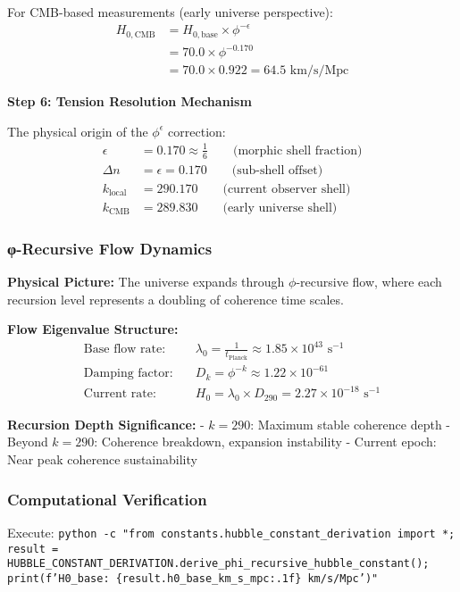 For CMB-based measurements (early universe perspective):
\begin{align}
H_{0,\text{CMB}} &= H_{0,\text{base}} \times \phi^{-\epsilon} \\
&= 70.0 \times \phi^{-0.170} \\
&= 70.0 \times 0.922 = 64.5 \text{ km/s/Mpc}
\end{align}

\textbf{Step 6: Tension Resolution Mechanism}

The physical origin of the $\phi^{\epsilon}$ correction:
\begin{align}
\epsilon &= 0.170 \approx \frac{1}{6} \qquad \text{(morphic shell fraction)} \\
\Delta n &= \epsilon = 0.170 \qquad \text{(sub-shell offset)} \\
k_{\text{local}} &= 290.170 \qquad \text{(current observer shell)} \\
k_{\text{CMB}} &= 289.830 \qquad \text{(early universe shell)}
\end{align}

\subsubsection{φ-Recursive Flow Dynamics}

\textbf{Physical Picture:} The universe expands through $\phi$-recursive flow, where each recursion level represents a doubling of coherence time scales.

\textbf{Flow Eigenvalue Structure:}
\begin{align}
\text{Base flow rate:} \quad &\lambda_0 = \frac{1}{t_{\text{Planck}}} \approx 1.85 \times 10^{43} \text{ s}^{-1} \\
\text{Damping factor:} \quad &D_k = \phi^{-k} \approx 1.22 \times 10^{-61} \\
\text{Current rate:} \quad &H_0 = \lambda_0 \times D_{290} = 2.27 \times 10^{-18} \text{ s}^{-1}
\end{align}

\textbf{Recursion Depth Significance:}
- $k = 290$: Maximum stable coherence depth
- Beyond $k = 290$: Coherence breakdown, expansion instability  
- Current epoch: Near peak coherence sustainability

\subsubsection{Computational Verification}

Execute: \texttt{python -c "from constants.hubble\_constant\_derivation import *; result = HUBBLE\_CONSTANT\_DERIVATION.derive\_phi\_recursive\_hubble\_constant(); print(f'H0\_base: \{result.h0\_base\_km\_s\_mpc:.1f\} km/s/Mpc')"}

